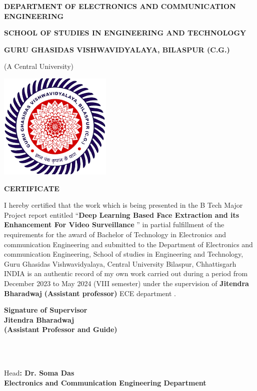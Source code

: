 
\textbf{DEPARTMENT OF ELECTRONICS AND COMMUNICATION ENGINEERING}

\textbf{SCHOOL OF STUDIES IN ENGINEERING AND TECHNOLOGY}

\textbf{GURU GHASIDAS VISHWAVIDYALAYA, BILASPUR (C.G.)}

(A Central University)

\includegraphics[width=0.2\linewidth]{college logo.png}

\textbf{CERTIFICATE}

\justifying{}
I hereby certified that the work which is being presented in the B Tech Major Project report entitled “\textbf{Deep Learning Based Face Extraction and its Enhancement For Video Surveillance }” in partial fulfillment of the requirements for the award of Bachelor of Technology in Electronics and communication Engineering and submitted to the Department of Electronics and communication Engineering, School of studies in Engineering and Technology, Guru Ghasidas Vishwavidyalaya, Central University Bilaspur, Chhattisgarh INDIA is an authentic record of my own work carried out during a period from December 2023 to May 2024 (VIII semester) under the supervision of \textbf{Jitendra Bharadwaj }\textbf{(Assistant professor) }ECE department .

\begin{flushright} 
\textbf{Signature of Supervisor\\}
\textbf{Jitendra Bharadwaj\\(Assistant Professor and Guide)\\}
\end{flushright}

\begin{center}

\textbf{\\}
\textbf{\\}

Head\textbf{: Dr. Soma Das\\}
\textbf{Electronics and Communication Engineering Department\\}
\end{center} 
